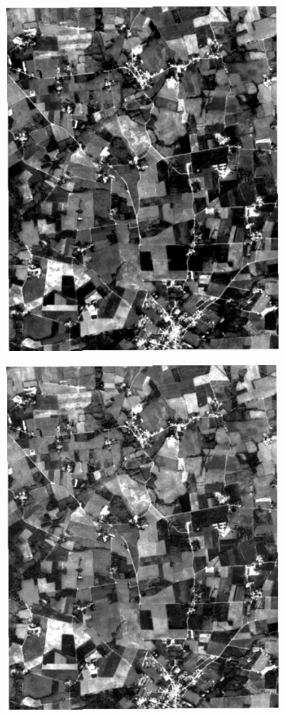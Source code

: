 \documentclass[journal,article,submit,pdftex,moreauthors]{Definitions/mdpi}
\begin{document}
\begin{figure}[H]
\begin{subfigure}[t]{0.23\linewidth}
	 \caption{}
	\label{fig:r_aes_b2_4}
	\end{subfigure}
	\begin{subfigure}[t]{0.23\linewidth}
		\centering
		\includegraphics[height=\linewidth,width=0.95\linewidth]{figures/reconstruction_errors/reconstruction_B2_AEs5.pdf}
    \caption{}
	\label{fig:r_aes_b2_5}
	\end{subfigure}
	\begin{subfigure}[t]{0.23\linewidth}
		\centering
		\includegraphics[height=\linewidth,width=0.95\linewidth]{figures/reconstruction_errors/reconstruction_B2_AEs6.pdf}

\end{subfigure}
\end{figure}
\end{document}
